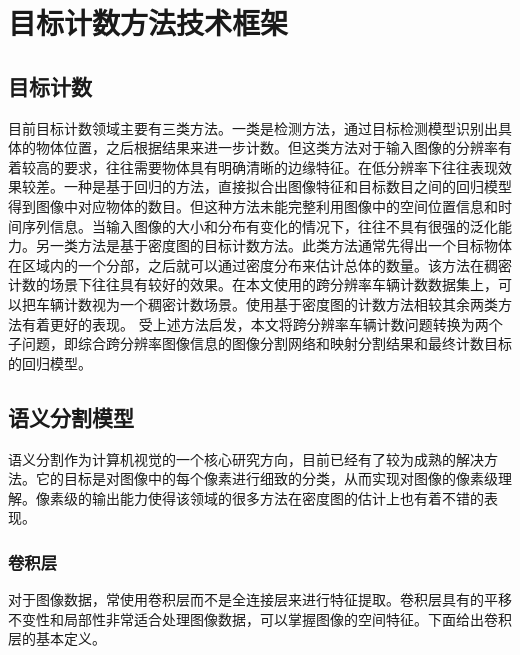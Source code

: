 
\chapter{目标计数方法技术框架}
\section{目标计数}
目前目标计数领域主要有三类方法。一类是检测方法\cite{2015FastRCNN}\cite{2016FasterRCNNRealTimeObjectDetectionRegionProposalNetworks}\cite{2018YOLOv3IncrementalImprovement}\cite{2018MaskRCNN}\cite{2019ObjectDetectionCountObjectsImageusingTensorFlowObjectDetectionAPI}，通过目标检测模型识别出具体的物体位置，之后根据结果来进一步计数。但这类方法对于输入图像的分辨率有着较高的要求，往往需要物体具有明确清晰的边缘特征。在低分辨率下往往表现效果较差。一种是基于回归的方法\cite{2009BayesianPoissonRegressionCrowdCounting}\cite{2013MultisourceMultiscaleCountingExtremelyDenseCrowdImages}\cite{2009CrowdCountingUsingMultipleLocalFeatures}，直接拟合出图像特征和目标数目之间的回归模型得到图像中对应物体的数目。但这种方法未能完整利用图像中的空间位置信息和时间序列信息。当输入图像的大小和分布有变化的情况下，往往不具有很强的泛化能力。另一类方法是基于密度图的目标计数方法\cite{2018CSRNetDilatedConvolutionalNeuralNetworksUnderstandingHighlyCongestedScenesa}\cite{2016SingleImageCrowdCountingMultiColumnConvolutionalNeuralNetwork}\cite{2018CrowdCountingusingDeepRecurrentSpatialAwareNetwork}\cite{2018VehicleDetectionCountingHighResolutionAerialImagesUsingConvolutionalRegressionNeuralNetwork}。此类方法通常先得出一个目标物体在区域内的一个分部，之后就可以通过密度分布来估计总体的数量。该方法在稠密计数的场景下往往具有较好的效果。在本文使用的跨分辨率车辆计数数据集上，可以把车辆计数视为一个稠密计数场景。使用基于密度图的计数方法相较其余两类方法有着更好的表现。
受上述方法启发，本文将跨分辨率车辆计数问题转换为两个子问题，即综合跨分辨率图像信息的图像分割网络和映射分割结果和最终计数目标的回归模型。
\section{语义分割模型}
语义分割\cite{2020ImageSegmentationUsingDeepLearningSurvey}作为计算机视觉的一个核心研究方向，目前已经有了较为成熟的解决方法。它的目标是对图像中的每个像素进行细致的分类，从而实现对图像的像素级理解。像素级的输出能力使得该领域的很多方法在密度图的估计上也有着不错的表现。
\subsection{卷积层}
对于图像数据，常使用卷积层\cite{2020ImageSegmentationUsingDeepLearningSurvey}\cite{2012ImageNetClassificationDeepConvolutionalNeuralNetworks}而不是全连接层来进行特征提取。卷积层具有的平移不变性和局部性非常适合处理图像数据，可以掌握图像的空间特征。下面给出卷积层的基本定义。

